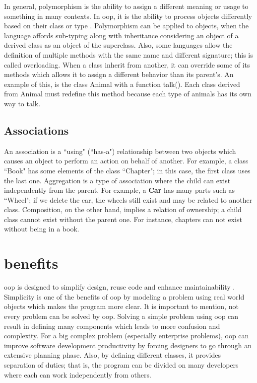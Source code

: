 \documentclass[12pt]{KodeBookAr}
\begin{document}
In general, polymorphism is the ability to assign a different meaning or usage to something in many contexts. 
In \ac{oop}, it is the ability to process objects differently based on their class or type \citep{2016-techdifferences}. 
Polymorphism can be applied to objects, when the language affords sub-typing along with inheritance considering an object of a derived class as an object of the superclass. 
Also, some languages allow the definition of multiple methods with the same name and different signature; this is called overloading.
When a class inherit from another, it can override some of its methods which allows it to assign a different behavior than its parent's.
An example of this, is the class Animal with a function talk(). 
Each class derived from Animal must redefine this method because each type of animals has its own way to talk.


\subsection{Associations}

An association is a ``using" (``has-a") relationship between two objects which causes an object to perform an action on behalf of another. 
For example, a class ``Book" has some elements of the class ``Chapter"; in this case, the first class uses the last one.
Aggregation is a type of association where the child can exist independently from the parent.
For example, a \textbf{Car} has many parts such as ``Wheel"; if we delete the car, the wheels still exist and may be related to another class. 
Composition, on the other hand, implies a relation of ownership; a child class cannot exist without the parent one.
For instance, chapters can not exist without being in a book.

\section{benefits}


\ac{oop} is designed to simplify design, reuse code and enhance maintainability \citep{2017-half,2015-popyack-boady}.
Simplicity is one of the benefits of \ac{oop} by modeling a problem using real world objects which makes the program more clear.
It is important to mention, not every problem can be solved by \ac{oop}. 
Solving a simple problem using \ac{oop} can result in defining many components which leads to more confusion and complexity. 
For a big complex problem (especially enterprise problems), \ac{oop} can improve software development productivity by forcing designers to go through an extensive planning phase. 
Also, by defining different classes, it provides separation of duties; that is, the program can be divided on many developers where each can work independently from others.
\end{document}
